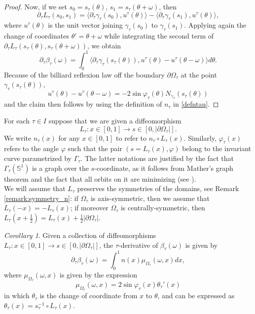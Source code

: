 \documentclass[12pt, openany]{amsart}
\theoremstyle{definition}
\theoremstyle{remark}
\theoremstyle{remark}
\theoremstyle{theorem}
\theoremstyle{theorem}
\theoremstyle{theorem}
\theoremstyle{theorem}
\newtheorem{corollary}[theorem]{Corollary}
\renewcommand{\SS}{\mathbb{S}}
\begin{document}
\begin{proof}
Now, if we set $s_0 = s_{\tau}(\theta)$, $s_1 = s_{\tau}(\theta+\omega)$, then
\[
\partial_{\tau} L_{\tau}(s_0,s_1) = 
\langle \partial_{\tau}\gamma_{\tau}(s_0), u^{\tau}(\theta) \rangle
-\langle \partial_{\tau}\gamma_{\tau}(s_1), u^{\tau}(\theta) \rangle,
\]
where $u^{\tau}(\theta)$ is the unit vector joining $\gamma_{\tau}(s_0)$ to $\gamma_{\tau}(s_1)$. Applying again the change of coordinates $\theta'=\theta+\omega$ while integrating the second term of $\partial_{\tau} L_{\tau}(s_{\tau}(\theta),s_{\tau}(\theta+\omega))$, we obtain
\[
\partial_{\tau}\beta_{\tau}(\omega) = \int_{0}^{1} 
\langle \partial_{\tau}\gamma_{\tau}(s_{\tau}(\theta)), u^{\tau}(\theta)-u^{\tau}(\theta-\omega) \rangle d\theta.
\]
Because of the billiard reflexion law off the boundary $\partial\Omega_{\tau}$ at the point $\gamma_{\tau}(s_{\tau}(\theta))$, 
\[
u^{\tau}(\theta)-u^{\tau}(\theta-\omega) = -2\sin\varphi_{\tau}(\theta)N_{\gamma_{\tau}}(s_{\tau}(\theta))
\]
and the claim then follows by using the definition of $n_\tau$ in \eqref{defntau}.
\end{proof}


\medskip
For each $\tau\in I$ suppose that we are given a diffeomorphism
\[
L_{\tau}:x\in[0,1]\to s\in[0,|\partial\Omega_{\tau}|].
\]
We write $n_{\tau}(x)$ for any $x\in[0,1]$ to refer to $n_{\tau}\circ L_{\tau}(x)$. Similarly, $\varphi_{\tau}(x)$ refers to the angle $\varphi$ such that the pair $(s=L_{\tau}(x),\varphi)$ belong to the invariant curve parametrized by $\Gamma_{\tau}$. The latter notations are justified by the fact that $\Gamma_{\tau}(\SS^1)$ is a graph over the $s$-coordinate, as it follows from Mather's graph theorem  and the fact that all orbits on it are minimizing (see \cite{ForniMather}).\\

We will assume that $L_{\tau}$ preserves the symmetries of the domains, see Remark \ref{remark:symmetry_n}: if $\Omega_{\tau}$ is axis-symmetric, then we assume that $L_{\tau}(-x)=-L_{\tau}(x)$; if moreover $\Omega_{\tau}$ is centrally-symmetric, then $L_{\tau}\left(x+\frac{1}{2}\right)=L_{\tau}(x)+\frac{1}{2}|\partial\Omega_{\tau}|$.\\

\begin{corollary}
\label{corollary:first_var_beta_density}
Given a collection of diffeomorphisms $L_{\tau}:x\in[0,1]\to s\in[0,|\partial\Omega_{\tau}|]$, the $\tau$-derivative of $\beta_{\tau}(\omega)$ is given by
\begin{equation}
\label{equation:beta_form2}
\partial_{\tau}\beta_{\tau}(\omega) = \int_0^{1}n(x)\mu_{\Omega_{\tau}}(\omega,x)dx,
\end{equation}
where $\mu_{\Omega_{\tau}}(\omega,x)$ is given by the expression
\[
\mu_{\Omega_{\tau}}(\omega,x) = 2\sin\varphi_{\tau}(x)\theta_{\tau}'(x)
\]
in which $\theta_{\tau}$ is the change of coordinate from $x$ to $\theta$, and can be expressed as $\theta_{\tau}(x) = s_{\tau}^{-1}\circ L_{\tau}(x)$.
\end{corollary}
\end{document}
